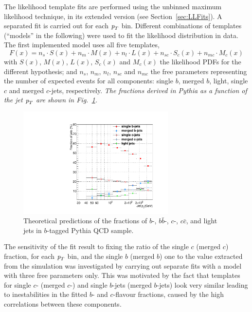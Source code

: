 The likelihood template fits are performed using the unbinned maximum likelihood technique, in its extended version (see Section~\ref{sec:LLFits}). A separated fit is carried out for each ${\emph{p}_{T}}$ bin. Different combinations of templates (``models'' in the following) were used to fit the likelihood distribution in data. The first implemented model uses all five templates,
%
\begin{equation}
F(x) = n_s \cdot S(x) + n_m \cdot M(x) + n_l \cdot L(x) + n_{sc} \cdot S_c(x) + n_{mc} \cdot M_c(x)
\end{equation}
%
with $S(x)$, $M(x)$, $L(x)$, $S_c(x)$ and $M_c(x)$ the likelihood PDFs for the different hypothesis; and $n_s$, $n_m$, $n_l$, $n_{sc}$ and $n_{mc}$ the free parameters representing the number of expected events for all components: single $b$, merged $b$, light, single $c$ and merged $c$-jets, respectively.  %
\emph{The fractions derived in {\sc Pythia}  as a function of the jet ${\emph{p}_{T}}$ are shown in Fig.~\ref{fig:truefractions}.}


\begin{figure}[tp]
\centering
\includegraphics[width=0.70\textwidth]{TrueFractions_NominalPythia.pdf}
\caption{Theoretical predictions of the fractions of $b$-, $b\bar{b}$-, $c$-, $c\bar{c}$, and light jets in $b$-tagged {\sc Pythia} QCD sample.}
\label{fig:truefractions}
\end{figure}


The sensitivity of the fit result to fixing the ratio of the single $c$ (merged $c$) fraction, for each ${\emph{p}_{T}}$ bin, and the single $b$ (merged $b$)  one to the value extracted from the simulation was investigated by carrying out separate fits with a model with three free parameters only. This was motivated by the fact that templates for single $c$- (merged $c$-)  and single $b$-jets (merged $b$-jets) look very similar leading to inestabilities in the fitted $b$- and $c$-flavour fractions, caused by the high correlations between these components. 


